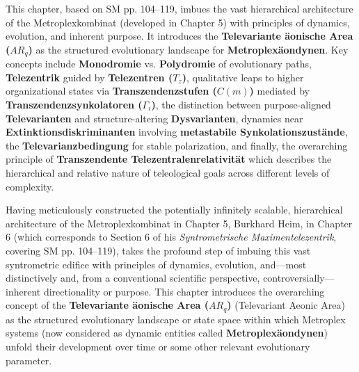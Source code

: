 \documentclass[12pt]{article}
\newcommand{\telezentrum}{T_z}
\newcommand{\aeonischearea}{AR_q}
\newcommand{\transzendenzstufe}[1]{C(#1)}
\newcommand{\transzendenzsynkolator}{\Gamma_i}
\begin{document}
This chapter, based on SM pp. 104–119, imbues the vast hierarchical architecture of the Metroplexkombinat (developed in Chapter 5) with principles of dynamics, evolution, and inherent purpose. It introduces the \textbf{Televariante \"{a}onische Area (\(\aeonischearea\))} as the structured evolutionary landscape for \textbf{Metroplexäondynen}. Key concepts include \textbf{Monodromie} vs. \textbf{Polydromie} of evolutionary paths, \textbf{Telezentrik} guided by \textbf{Telezentren (\(\telezentrum\))}, qualitative leaps to higher organizational states via \textbf{Transzendenzstufen (\(\transzendenzstufe{m}\))} mediated by \textbf{Transzendenzsynkolatoren (\(\transzendenzsynkolator\))}, the distinction between purpose-aligned \textbf{Televarianten} and structure-altering \textbf{Dysvarianten}, dynamics near \textbf{Extinktionsdiskriminanten} involving \textbf{metastabile Synkolationszustände}, the \textbf{Televarianzbedingung} for stable polarization, and finally, the overarching principle of \textbf{Transzendente Telezentralenrelativität} which describes the hierarchical and relative nature of teleological goals across different levels of complexity.

Having meticulously constructed the potentially infinitely scalable, hierarchical architecture of the Metroplexkombinat in Chapter 5, Burkhard Heim, in Chapter 6 (which corresponds to Section 6 of his \textit{Syntrometrische Maximentelezentrik}, covering SM pp. 104–119), takes the profound step of imbuing this vast syntrometric edifice with principles of dynamics, evolution, and—most distinctively and, from a conventional scientific perspective, controversially—inherent directionality or purpose. This chapter introduces the overarching concept of the \textbf{Televariante \"{a}onische Area (\(\aeonischearea\))} (Televariant Aeonic Area) as the structured evolutionary landscape or state space within which Metroplex systems (now considered as dynamic entities called \textbf{Metroplexäondynen}) unfold their development over time or some other relevant evolutionary parameter.
\end{document}
